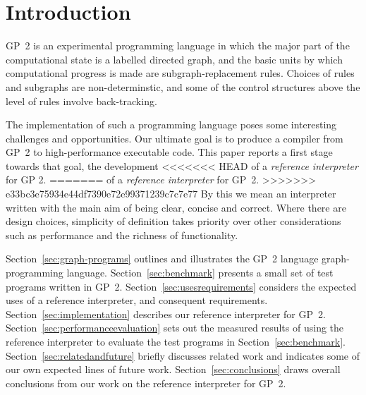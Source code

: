 \section{Introduction}

GP~2 is an experimental programming language in which the major part of
the computational state is a labelled directed graph, and the basic
units by which computational progress is made are subgraph-replacement
rules.
Choices of rules and subgraphs are non-determinstic, and some of
the control structures above the level of rules involve back-tracking.

The implementation of such a programming language poses some
interesting challenges and opportunities.
Our ultimate goal is to produce a compiler from GP~2 to
high-performance executable code.
This paper reports a first stage towards that goal, the development
<<<<<<< HEAD
of a \emph{reference interpreter}\/ for GP 2.
=======
of a \emph{reference interpreter} for GP~2.
>>>>>>> e33bc3e75934e44df7390e72e99371239c7c7e77
By this we mean an interpreter written with the main aim of
being clear, concise and correct.
Where there are design choices, simplicity of
definition takes priority over other considerations
such as performance and the richness of functionality.

Section~\ref{sec:graph-programs} outlines and illustrates the GP~2 language
graph-programming language.
Section~\ref{sec:benchmark} presents a small set of test programs
written in GP~2.
Section~\ref{sec:usesrequirements} considers the expected uses of
a reference interpreter, and consequent requirements.
Section~\ref{sec:implementation} describes our reference interpreter for
GP~2.
Section~\ref{sec:performanceevaluation} sets out the measured results of using the reference
interpreter to evaluate the test programs in Section~\ref{sec:benchmark}.
Section~\ref{sec:relatedandfuture} briefly discusses related work and
indicates some of our own expected lines of future work.
Section~\ref{sec:conclusions} draws overall conclusions from our work
on the reference interpreter for GP~2.

